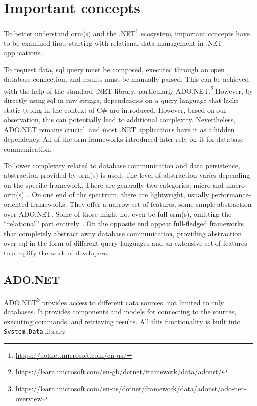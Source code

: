 \section{Important concepts}
To better understand \acrshort{orm}(s) and the .NET\footnote{\url{https://dotnet.microsoft.com/en-us/}} ecosystem, important concepts have to be examined first, starting with relational data management in .NET applications. 

To request data, \acrshort{sql} query must be composed, executed through an open database connection, and results must be manually parsed. This can be achieved with the help of the standard .NET library, particularly ADO.NET.\footnote{\url{https://learn.microsoft.com/en-gb/dotnet/framework/data/adonet/}} However, by directly using \acrshort{sql} in raw strings, dependencies on a query language that lacks static typing in the context of C\# are introduced. However, based on our observation, this can potentially lead to additional complexity. Nevertheless, ADO.NET remains crucial, and most .NET applications have it as a hidden dependency. All of the \acrshort{orm} frameworks introduced later rely on it for database communication. 

To lower complexity related to database communication and data persistence, abstraction provided by \acrshort{orm}(s) is used. The level of abstraction varies depending on the specific framework. There are generally two categories, micro and macro \acrshort{orm}(s)~\cite{shapovalov2024micro}. On one end of the spectrum, there are lightweight, usually performance-oriented frameworks. They offer a narrow set of features, some simple abstraction over ADO.NET. Some of those might not even be full \acrshort{orm}(s), omitting the ``relational'' part entirely~\cite{Dapper}. On the opposite end appear full-fledged frameworks that completely abstract away database communication, providing abstraction over \acrshort{sql} in the form of different query languages and an extensive set of features to simplify the work of developers.

\subsection{ADO.NET}
ADO.NET\footnote{\url{https://learn.microsoft.com/en-us/dotnet/framework/data/adonet/ado-net-overview}} provides access to different data sources, not limited to only databases. It provides components and models for connecting to the sources, executing commands, and retrieving results. All this functionality is built into \texttt{System.Data} library.

